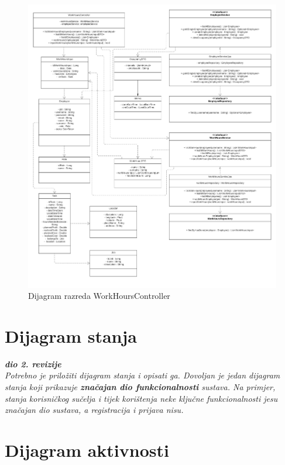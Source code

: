 			
			\eject
			\begin{figure}[H]
					\centering
					\includegraphics[width=\textwidth]{slike/Dijagram razreda - WorkHoursController.jpg}
					\caption{Dijagram razreda WorkHoursController}
				\end{figure}
			
			
			\eject
			
		
		\section{Dijagram stanja}
			
			
			\textbf{\textit{dio 2. revizije}}\\
			
			\textit{Potrebno je priložiti dijagram stanja i opisati ga. Dovoljan je jedan dijagram stanja koji prikazuje \textbf{značajan dio funkcionalnosti} sustava. Na primjer, stanja korisničkog sučelja i tijek korištenja neke ključne funkcionalnosti jesu značajan dio sustava, a registracija i prijava nisu. }
			
			
			\eject 
		
		\section{Dijagram aktivnosti}
			
